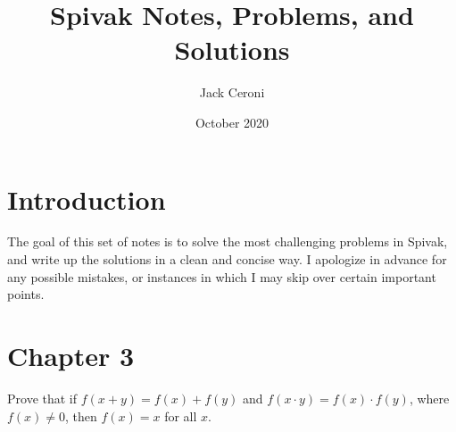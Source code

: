 \documentclass[10pt, oneside]{article}
\title{Spivak Notes, Problems, and Solutions}
\author{Jack Ceroni}
\date{October 2020}
\newenvironment{problem}[2][Problem]{\begin{trivlist}
\item[\hskip \labelsep {\bfseries #1}\hskip \labelsep {\bfseries #2.}]}{\end{trivlist}}
\begin{document}
    \maketitle
    \tableofcontents

    \vspace{.25in}

    \section{Introduction}

    The goal of this set of notes is to solve the most challenging problems in Spivak, and
    write up the solutions in a clean and concise way. I apologize in advance for any
    possible mistakes, or instances in which I may skip over certain important points.

    \newpage

    \section{Chapter 3}

    \begin{problem}{3.17}
      Prove that if $f(x + y) = f(x) + f(y)$ and $f(x \cdot y) = f(x) \cdot f(y)$, where $f(x) \neq 0$, then $f(x) = x$ for all $x$.
    \end{problem}
\end{document}
